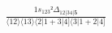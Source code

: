 \documentclass[varwidth, border=5pt]{standalone}
\begin{document}
\begin{my}
$\begin{gathered}
\scriptscriptstyle\frac{1s_{123}²Δ_{12|34|𝟓}}{⟨12⟩⟨13⟩⟨2|1+3|4]⟨3|1+2|4]}
\end{gathered}$
\end{my}
\end{document}
